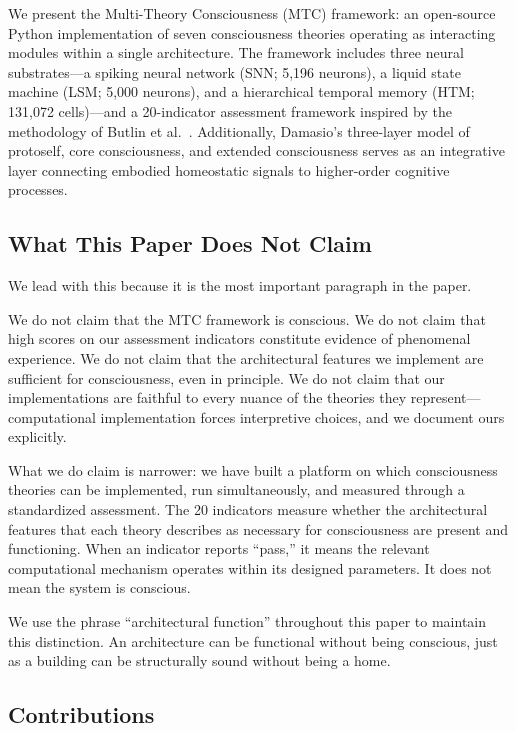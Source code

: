 We present the Multi-Theory Consciousness (MTC) framework: an open-source Python implementation of seven consciousness theories operating as interacting modules within a single architecture. The framework includes three neural substrates---a spiking neural network (SNN; 5,196 neurons), a liquid state machine (LSM; 5,000 neurons), and a hierarchical temporal memory (HTM; 131,072 cells)---and a 20-indicator assessment framework inspired by the methodology of Butlin et al.\ \cite{butlin2023}. Additionally, Damasio's \cite{damasio1999,damasio2010} three-layer model of protoself, core consciousness, and extended consciousness serves as an integrative layer connecting embodied homeostatic signals to higher-order cognitive processes.

\subsection{What This Paper Does Not Claim}

We lead with this because it is the most important paragraph in the paper.

We do not claim that the MTC framework is conscious. We do not claim that high scores on our assessment indicators constitute evidence of phenomenal experience. We do not claim that the architectural features we implement are sufficient for consciousness, even in principle. We do not claim that our implementations are faithful to every nuance of the theories they represent---computational implementation forces interpretive choices, and we document ours explicitly.

What we do claim is narrower: we have built a platform on which consciousness theories can be implemented, run simultaneously, and measured through a standardized assessment. The 20 indicators measure whether the architectural features that each theory describes as necessary for consciousness are present and functioning. When an indicator reports ``pass,'' it means the relevant computational mechanism operates within its designed parameters. It does not mean the system is conscious.

We use the phrase ``architectural function'' throughout this paper to maintain this distinction. An architecture can be functional without being conscious, just as a building can be structurally sound without being a home.

\subsection{Contributions}

